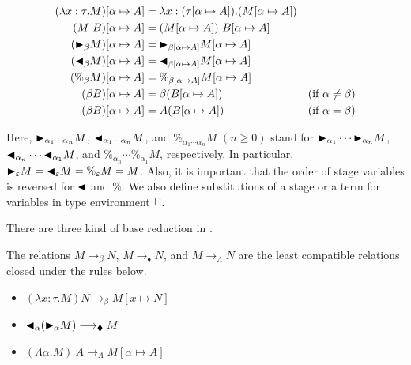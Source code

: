 \begin{align*}
    (\lambda x:\tau.M)[\alpha \mapsto A] & = \lambda x:(\tau[\alpha \mapsto A]).(M[\alpha \mapsto A])                                  \\
    (M\ B)[\alpha \mapsto A]             & = (M[\alpha \mapsto A])\ B[\alpha\mapsto A]                                                 \\
    ({\mathop{\blacktriangleright}}_\beta M)[\alpha \mapsto A]      & = {\mathop{\blacktriangleright}}_{\beta[\alpha \mapsto A]}M[\alpha \mapsto A]                                          \\
    ({\mathop{\blacktriangleleft}}_\beta M)[\alpha \mapsto A]     & = {\mathop{\blacktriangleleft}}_{\beta[\alpha \mapsto A]}M[\alpha \mapsto A]                                         \\
    (\%_\beta M)[\alpha \mapsto A]       & = \%_{\beta[\alpha \mapsto A]}M[\alpha \mapsto A]                                           \\
    (\beta B)[\alpha \mapsto A]          & = \beta (B[\alpha\mapsto A])                               & (\text{if } \alpha \neq \beta) \\
    (\beta B)[\alpha \mapsto A]          & = A (B[\alpha\mapsto A])                                   & (\text{if } \alpha = \beta)
\end{align*}


Here, ${\mathop{\blacktriangleright}}_{\alpha_1\cdots\alpha_n} M$, ${\mathop{\blacktriangleleft}}_{\alpha_1\cdots\alpha_n} M$, and
$\%_{\alpha_1\cdots\alpha_n} M$ $(n \geq 0)$ stand for ${\mathop{\blacktriangleright}}_{\alpha_1} \cdots
{\mathop{\blacktriangleright}}_{\alpha_n} M$, ${\mathop{\blacktriangleleft}}_{\alpha_n}\cdots {\mathop{\blacktriangleleft}}_{\alpha_1} M$, and
$\%_{\alpha_n}\cdots \%_{\alpha_1} M$, respectively.  In particular,
${\mathop{\blacktriangleright}}_{\varepsilon} M = {\mathop{\blacktriangleleft}}_{\varepsilon} M = \%_{\varepsilon} M = M$.  Also,
it is important that the order of stage variables is reversed for ${\mathop{\blacktriangleleft}}$ and
$\%$.  We also define substitutions of a stage or a term for variables in type
environment $\Gamma$.


There are three kind of base reduction in \LMD.

\begin{definition}
    The relations $M \longrightarrow_\beta N$, $M \longrightarrow_\blacklozenge N$, and $M \longrightarrow_\Lambda N$ are the least compatible relations closed under the rules below.
    \begin{itemize}
        \item \( (\lambda x:\tau.M) N \longrightarrow_\beta M[x \mapsto N] \)
        \item \( {\mathop{\blacktriangleleft}}_\alpha ({\mathop{\blacktriangleright}}_\alpha M)\longrightarrow_\blacklozenge M \)
        \item \( (\Lambda \alpha.M)\ A \longrightarrow_\Lambda M[\alpha \mapsto A] \)
    \end{itemize}
\end{definition}

